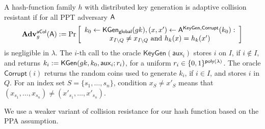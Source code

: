 \begin{definition} \label{def:hash1-adaptive}
A hash-function family $h$ with distributed key generation is adaptive collision resistant if for all PPT adversary $\mathsf{A}$
$$
\mathbf{Adv}_g^{\mathsf{aCol}}(\mathsf{A}) := \Pr\left[\begin{array}{c}
k_0\gets\mathsf{KGen}_{\mathsf{global}}(gk), (x,x')\gets \mathsf{A}^{\mathsf{KeyGen},\mathsf{Corrupt}}(k_0):\\
x_{I\setminus Q} \neq x_{I\setminus Q}\text{ and }h_k(x)=h_k(x')
\end{array}\right]
$$ 
is negligible in $\lambda$.  The $i$-th call to the oracle $\mathsf{KeyGen}(\mathsf{aux}_i)$ stores $i$ on $I$, if $i\notin I$, and returns $k_i:=\mathsf{KGen}(gk,k_0,\mathsf{aux}_i;r_i)$, for a uniform $r_i\in\{0,1\}^{\mathsf{poly}(\lambda)}$. The oracle $\mathsf{Corrupt}(i)$ returns the random coins used to generate $k_i$, if $i\in I$, and stores $i$ in $Q$. For an index set $S  = \{s_1,\ldots,s_n\}$, condition $x_{S} \neq x'_{S}$ means that $(x_{s_1},\ldots, x_{s_n})\neq (x'_{s_1},\ldots,x'_{s_n})$. 
\end{definition}

We use a weaker variant of collision resistance for our hash function based on the PPA assumption.

